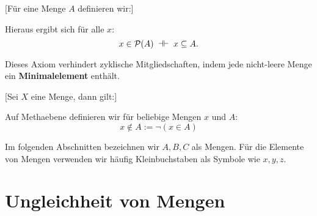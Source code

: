\documentclass[main.tex]{subfiles}
\begin{document}

[Für eine Menge \(A\) definieren wir:]
\begin{remark}
Hieraus ergibt sich für alle \(x\):
\[
x \in \mathcal{P}(A) 
\;\dashv\vdash\; 
x \subseteq A.
\]
\end{remark}



\begin{remark}
Dieses Axiom verhindert zyklische Mitgliedschaften, indem jede nicht-leere Menge ein 
\textbf{Minimalelement} enthält.    
\end{remark}


[Sei \(X\) eine Menge, dann gilt:]
\begin{remark}
Auf Methaebene definieren wir für beliebige Mengen \(x\) und \(A\): \[x\not\in A:=\neg(x\in A)\]
\end{remark}
\begin{remark}
Im folgenden Abschnitten bezeichnen wir \(A,B,C\) als Mengen. Für die Elemente von Mengen verwenden wir häufig Kleinbuchstaben als Symbole wie \(x,y,z\).
\end{remark}

\section{Ungleichheit von Mengen}
\end{document}

